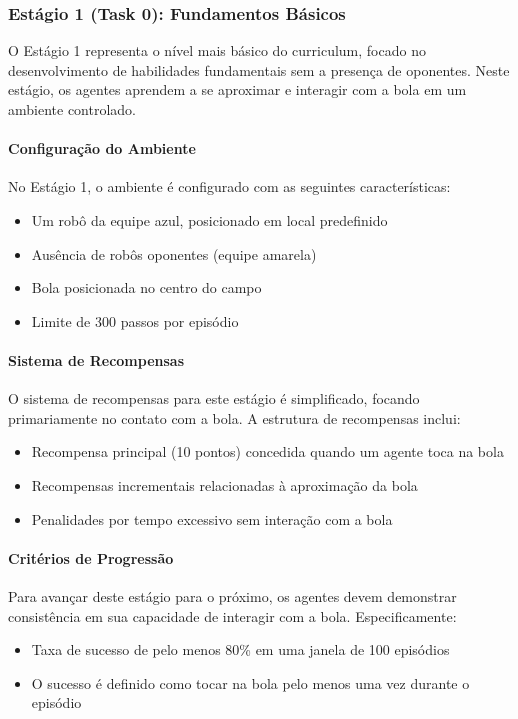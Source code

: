 \subsubsection{Estágio 1 (Task 0): Fundamentos Básicos}
\label{subsubsec:estagio1}

O Estágio 1 representa o nível mais básico do curriculum, focado no desenvolvimento de habilidades fundamentais sem a presença de oponentes. Neste estágio, os agentes aprendem a se aproximar e interagir com a bola em um ambiente controlado.

\paragraph{Configuração do Ambiente}

No Estágio 1, o ambiente é configurado com as seguintes características:
\begin{itemize}
    \item Um robô da equipe azul, posicionado em local predefinido
    \item Ausência de robôs oponentes (equipe amarela)
    \item Bola posicionada no centro do campo
    \item Limite de 300 passos por episódio
\end{itemize}

\paragraph{Sistema de Recompensas}

O sistema de recompensas para este estágio é simplificado, focando primariamente no contato com a bola. A estrutura de recompensas inclui:
\begin{itemize}
    \item Recompensa principal (10 pontos) concedida quando um agente toca na bola
    \item Recompensas incrementais relacionadas à aproximação da bola
    \item Penalidades por tempo excessivo sem interação com a bola
\end{itemize}

\paragraph{Critérios de Progressão}

Para avançar deste estágio para o próximo, os agentes devem demonstrar consistência em sua capacidade de interagir com a bola. Especificamente:
\begin{itemize}
    \item Taxa de sucesso de pelo menos 80\% em uma janela de 100 episódios
    \item O sucesso é definido como tocar na bola pelo menos uma vez durante o episódio
\end{itemize}


